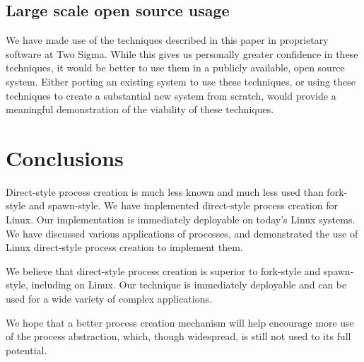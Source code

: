 \documentclass[sigplan]{acmart}
\begin{document}
\subsection{Large scale open source usage}
We have made use of the techniques described in this paper
in proprietary software at Two Sigma.
While this gives us personally greater confidence in these techniques,
it would be better to use them in a publicly available, open source system.
Either porting an existing system to use these techniques,
or using these techniques to create a substantial new system from scratch,
would provide a meaningful demonstration of the viability of these techniques.
\section{Conclusions}\label{conclusions}
Direct-style process creation is much less known and much less used than fork-style and spawn-style.
We have implemented direct-style process creation for Linux.
Our implementation is immediately deployable on today's Linux systems.
We have discussed various applications of processes,
and demonstrated the use of Linux direct-style process creation
to implement them.

We believe that direct-style process creation is superior to fork-style and spawn-style,
including on Linux.
Our technique is immediately deployable and can be used for a wide variety of complex applications.

We hope that a better process creation mechanism
will help encourage more use of the process abstraction,
which, though widespread,
is still not used to its full potential.



\end{document}
